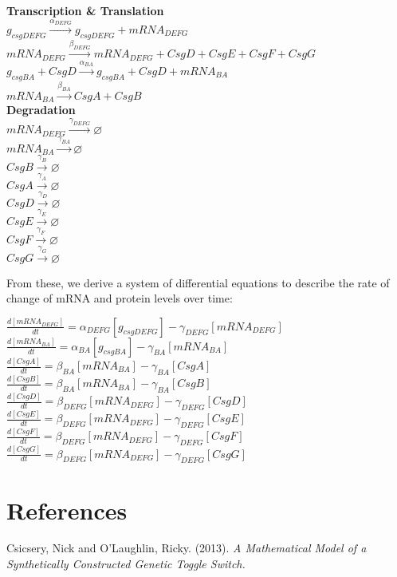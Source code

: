 \documentclass[11pt, oneside]{article}   	%
\begin{document}
\begin{center}
\textbf{Transcription \& Translation} \\
\bigskip
$g_{csgDEFG} \xrightarrow{\alpha_{DEFG}}  g_{csgDEFG} + mRNA_{DEFG}$ \\
\bigskip
$mRNA_{DEFG} \xrightarrow{\beta_{DEFG}} mRNA_{DEFG} + CsgD + CsgE + CsgF + CsgG$ \\
\bigskip
$g_{csgBA} + CsgD \xrightarrow{\alpha_{BA}}  g_{csgBA} + CsgD + mRNA_{BA} $ \\
\bigskip
$mRNA_{BA} \xrightarrow{\beta_{BA}} CsgA + CsgB$ \\ 

\hfill \break
\textbf{Degradation} \\
\bigskip
$mRNA_{DEFG} \xrightarrow{\gamma_{DEFG}} \varnothing$ \\ 
\bigskip
$mRNA_{BA} \xrightarrow{\gamma_{BA}}  \varnothing$ \\ 
\bigskip
$CsgB \xrightarrow{\gamma_{B}}  \varnothing$ \\ 
\bigskip
$CsgA \xrightarrow{\gamma_{A}}  \varnothing$ \\
\bigskip
$CsgD \xrightarrow{\gamma_{D}}  \varnothing$ \\
\bigskip
$CsgE \xrightarrow{\gamma_{E}}  \varnothing$ \\
\bigskip
$CsgF \xrightarrow{\gamma_{F}}  \varnothing$ \\
\bigskip
$CsgG \xrightarrow{\gamma_{G}}  \varnothing$ \\

\end{center}

From these, we derive a system of differential equations to describe the rate of change of mRNA and protein levels over time:

\begin{center}
$\frac{d[mRNA_{DEFG}]}{dt} = \alpha_{DEFG}[g_{csgDEFG}] - \gamma_{DEFG}[mRNA_{DEFG}]$ \\
\bigskip
$\frac{d[mRNA_{BA}]}{dt} = \alpha_{BA}[g_{csgBA}] - \gamma_{BA}[mRNA_{BA}]$ \\
\bigskip
$\frac{d[CsgA]}{dt} = \beta_{BA}[mRNA_{BA}] - \gamma_{BA}[CsgA]$ \\
\bigskip
$\frac{d[CsgB]}{dt} =  \beta_{BA}[mRNA_{BA}] - \gamma_{BA}[CsgB]$ \\
\bigskip
$\frac{d[CsgD]}{dt} =  \beta_{DEFG}[mRNA_{DEFG}] - \gamma_{DEFG}[CsgD]$ \\
\bigskip
$\frac{d[CsgE]}{dt} =  \beta_{DEFG}[mRNA_{DEFG}] - \gamma_{DEFG}[CsgE]$ \\
\bigskip
$\frac{d[CsgF]}{dt} =  \beta_{DEFG}[mRNA_{DEFG}] - \gamma_{DEFG}[CsgF]$ \\
\bigskip
$\frac{d[CsgG]}{dt} =  \beta_{DEFG}[mRNA_{DEFG}] - \gamma_{DEFG}[CsgG]$ \\

\end{center}

\section{References}

Csicsery, Nick and O'Laughlin, Ricky. (2013). \textit{A Mathematical Model of a Synthetically Constructed Genetic Toggle Switch.}
\end{document}
